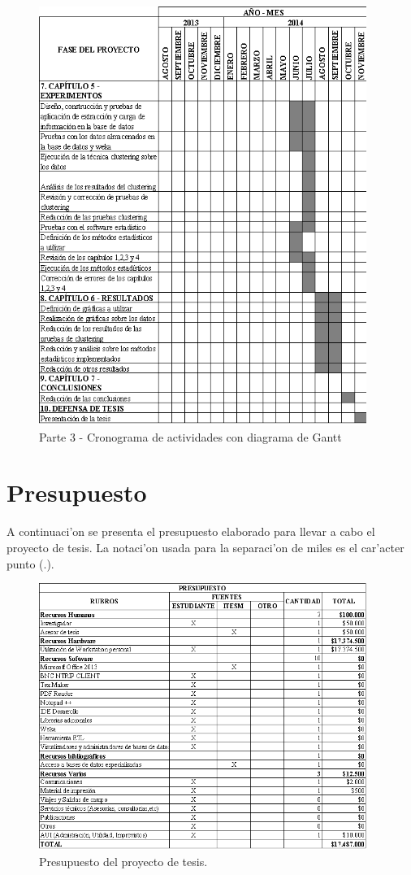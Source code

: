 \begin{figure}[H]
\centering
\includegraphics[width=0.95\textwidth]{images/Gantt_3}
\caption{Parte 3 - Cronograma de actividades con diagrama de Gantt}
\label{fig:3.3}
\end{figure}

\section{Presupuesto}
\noindent
A continuaci'on se presenta el presupuesto elaborado para llevar a cabo el proyecto de tesis.
La notaci'on usada para la separaci'on de miles es el car'acter punto (.).\\

\begin{figure}[H]
\centering
\includegraphics[width=0.95\textwidth]{images/Presupuesto}
\caption{Presupuesto del proyecto de tesis.}
\label{fig:3.4}
\end{figure}

\clearpage
